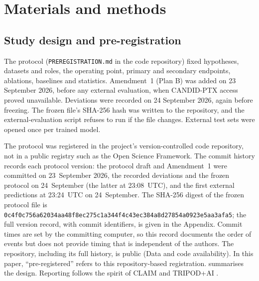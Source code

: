 \documentclass{ieeeaccess}
\begin{document}
\section{Materials and methods}
\label{sec:methods}

\subsection{Study design and pre-registration}
\label{sec:design}
The protocol (\texttt{PREREGISTRATION.md} in the code repository) fixed hypotheses, datasets and roles, the operating point, primary and secondary endpoints, ablations, baselines and statistics. Amendment~1 (Plan B) was added on 23 September 2026, before any external evaluation, when CANDID-PTX access proved unavailable. Deviations were recorded on 24 September 2026, again before freezing. The frozen file's SHA-256 hash was written to the repository, and the external-evaluation script refuses to run if the file changes. External test sets were opened once per trained model.

The protocol was registered in the project's version-controlled code repository, not in a public registry such as the Open Science Framework. The commit history records each protocol version: the protocol draft and Amendment~1 were committed on 23~September 2026, the recorded deviations and the frozen protocol on 24~September (the latter at 23:08~UTC), and the first external predictions at 23:24~UTC on 24~September. The SHA-256 digest of the frozen protocol file is \texttt{0c4f0c756a62034aa48f8ec275c1a344\allowbreak f4c43ec384a8d27854a0923e5aa3afa5}; the full version record, with commit identifiers, is given in the Appendix. Commit times are set by the committing computer, so this record documents the order of events but does not provide timing that is independent of the authors. The repository, including its full history, is public (Data and code availability). In this paper, ``pre-registered'' refers to this repository-based registration.  summarises the design. Reporting follows the spirit of CLAIM and TRIPOD+AI \cite{mongan2020claim,collins2024tripodai}.
\end{document}
